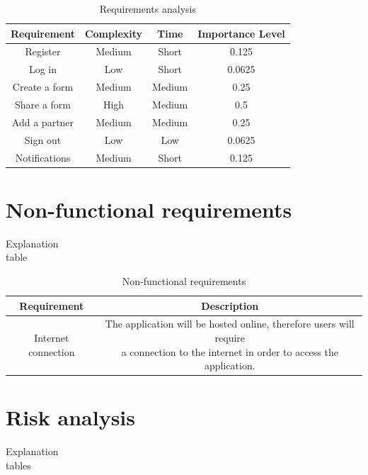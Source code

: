 \begin{table}[h]
    \centering
    \begin{tabular}{|c|c|c|c|}
        \hline
        Requirement & Complexity & Time & Importance Level\\
        \hline
        \hline
        Register & Medium & Short & 0.125\\
        \hline
        Log in & Low & Short & 0.0625\\
        \hline
        Create a form & Medium & Medium & 0.25\\
        \hline
        Share a form & High & Medium & 0.5\\
        \hline
        Add a partner & Medium & Medium & 0.25\\
        \hline
        Sign out & Low & Low & 0.0625\\
        \hline
        Notifications & Medium & Short & 0.125\\
        \hline
    \end{tabular}
    \caption{Requirements analysis}
\end{table}

\section{Non-functional requirements}
Explanation\\table

\begin{table}
    \centering
    \begin{tabular}{|c|c|}
        \hline
        Requirement & Description\\
        \hline
        \hline
        Internet connection & \makecell{The application will be hosted online, therefore users will require\\a connection to the internet in order to access the application.}\\
        \hline
    \end{tabular}
    \caption{Non-functional requirements}
\end{table}

\section{Risk analysis}
Explanation\\tables

